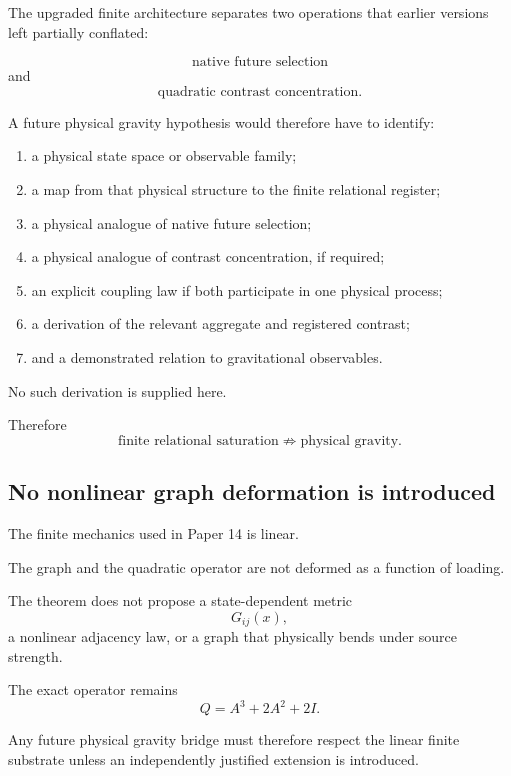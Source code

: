 The upgraded finite architecture separates two operations that earlier
versions left partially conflated:

\[
\text{native future selection}
\]
and
\[
\text{quadratic contrast concentration}.
\]

A future physical gravity hypothesis would therefore have to identify:

\begin{enumerate}[label=(\roman*)]

\item a physical state space or observable family;

\item a map from that physical structure to the finite relational
register;

\item a physical analogue of native future selection;

\item a physical analogue of contrast concentration, if required;

\item an explicit coupling law if both participate in one physical
process;

\item a derivation of the relevant aggregate and registered contrast;

\item and a demonstrated relation to gravitational observables.

\end{enumerate}

No such derivation is supplied here.

Therefore
\[
\text{finite relational saturation}
\not\Rightarrow
\text{physical gravity}.
\]

\subsection{No nonlinear graph deformation is introduced}

The finite mechanics used in Paper 14 is linear.

The graph and the quadratic operator are not deformed as a function
of loading.

The theorem does not propose a state-dependent metric
\[
G_{ij}(x),
\]
a nonlinear adjacency law, or a graph that physically bends under
source strength.

The exact operator remains
\[
Q=A^3+2A^2+2I.
\]

Any future physical gravity bridge must therefore respect the linear
finite substrate unless an independently justified extension is
introduced.

